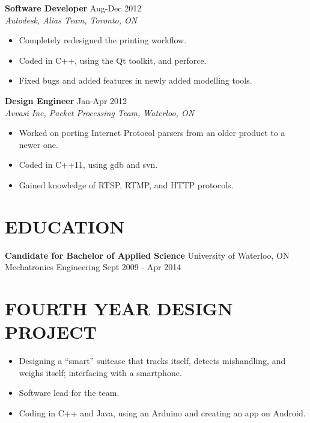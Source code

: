 \documentclass[line]{res}
\begin{document}
\begin{resume}
        {\bf Software Developer} \hfill Aug-Dec 2012 \\
        {\sl Autodesk, Alias Team, Toronto, ON} \\
        \begin{itemize}
        \item Completely redesigned the printing workflow.
        \item Coded in C++, using the Qt toolkit, and perforce.
        \item Fixed bugs and added features in newly added modelling tools.
        \end{itemize}

        {\bf Design Engineer} \hfill Jan-Apr 2012 \\
        {\sl Avvasi Inc, Packet Processing Team, Waterloo, ON} \\
        \begin{itemize}
        \item Worked on porting Internet Protocol parsers from an older product to a newer one.
        \item Coded in C++11, using gdb and svn.
        \item Gained knowledge of RTSP, RTMP, and HTTP protocols.
        \end{itemize}

\section{EDUCATION}
        {\bf Candidate for Bachelor of Applied Science} \hfill University of Waterloo, ON \\
        Mechatronics Engineering \hfill Sept 2009 - Apr 2014

\section{FOURTH YEAR DESIGN PROJECT}
        \begin{itemize}
        \item Designing a ``smart'' suitcase that tracks itself, detects mishandling, and weighs itself; interfacing with a smartphone.
        \item Software lead for the team.
        \item Coding in C++ and Java, using an Arduino and creating an app on Android.
        \end{itemize}
\end{resume}
\end{document}

